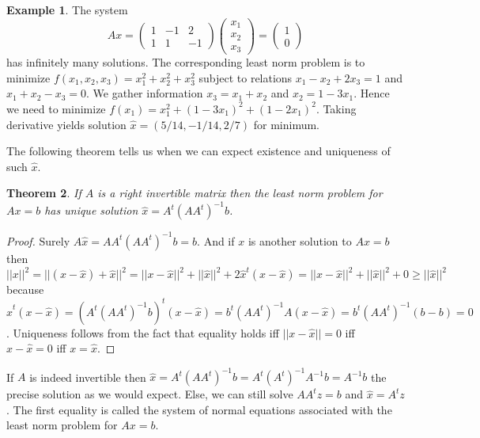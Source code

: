 \documentclass[12pt]{amsart}
\newtheorem{theorem}{Theorem}[section]
\theoremstyle{definition}
\newtheorem{example}[theorem]{Example}
\begin{document}
\begin{example}\label{leastnormproblemexample2} The system
$$Ax = \left(\begin{array}{ccc} 1 & -1 & 2 \\ 1 & 1 & -1 \end{array}\right) \left(\begin{array}{c} x_1 \\ x_2 \\ x_3 \end{array}\right) = \left(\begin{array}{c} 1 \\ 0 \end{array}\right)$$
has infinitely many solutions. The corresponding least norm problem is to minimize $f(x_1, x_2, x_3) = x_1^2 + x_2^2 + x_3^2$ subject to relations $x_1 - x_2 + 2x_3 = 1$ and $x_1 + x_2 - x_3 = 0$. We gather information $x_3 = x_1 + x_2$ and $x_2 = 1 - 3x_1$. Hence we need to minimize $f(x_1) = x_1^2 + (1-3x_1)^2 + (1-2x_1)^2$. Taking derivative yields solution $\hat{x} = (5/14, -1/14, 2/7)$ for minimum.
\end{example}

The following theorem tells us when we can expect existence and uniqueness of such $\hat{x}$.

\begin{theorem}\label{} If $A$ is a right invertible matrix then the least norm problem for $Ax = b$ has unique solution $\hat{x} = A^t(AA^t)^{-1} b$.
\end{theorem}
\begin{proof} Surely $A\hat{x} = AA^t(AA^t)^{-1}b = b$. And if $x$ is another solution to $Ax = b$ then $||x||^2 = ||(x - \hat{x}) + \hat{x}||^2 = ||x - \hat{x}||^2 + ||\hat{x}||^2 + 2\hat{x}^t(x - \hat{x}) = ||x - \hat{x}||^2 + ||\hat{x}||^2 + 0 \geq ||\hat{x}||^2$ because $\hat{x}^t(x - \hat{x}) = (A^t(AA^t)^{-1}b)^t(x - \hat{x}) = b^t(AA^t)^{-1}A(x-\hat{x}) = b^t(AA^t)^{-1}(b-b) = 0$. Uniqueness follows from the fact that equality holds iff $||x - \hat{x}|| = 0$ iff $x - \hat{x} = 0$ iff $x = \hat{x}$.
\end{proof}

If $A$ is indeed invertible then $\hat{x} = A^t(AA^t)^{-1} b = A^t(A^t)^{-1} A^{-1} b = A^{-1} b$ the precise solution as we would expect. Else, we can still solve $AA^t z = b$ and $\hat{x} = A^t z$. The first equality is called the system of normal equations associated with the least norm problem for $Ax = b$.
\end{document}
